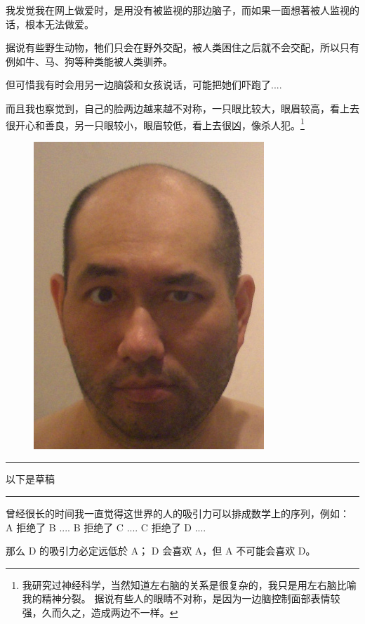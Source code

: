 \documentclass[12pt]{report}
\newcommand{\tab}{\hspace*{1cm}}
\newcommand*\todo{\begin{center}\color{red}  \rule{5cm}{0.5pt} 以下是草稿\, \rule{5cm}{0.5pt} \end{center}}
\begin{document}
我发觉我在网上做爱时，是用没有被监视的那边脑子，而如果一面想著被人监视的话，根本无法做爱。

据说有些野生动物，牠们只会在野外交配，被人类困住之后就不会交配，所以只有例如牛、马、狗等种类能被人类驯养。

但可惜我有时会用另一边脑袋和女孩说话，可能把她们吓跑了....

而且我也察觉到，自己的脸两边越来越不对称，一只眼比较大，眼眉较高，看上去很开心和善良，另一只眼较小，眼眉较低，看上去很凶，像杀人犯。\footnote{我研究过神经科学，当然知道左右脑的关系是很复杂的，我只是用左右脑比喻我的精神分裂。 据说有些人的眼睛不对称，是因为一边脑控制面部表情较强，久而久之，造成两边不一样。}

\begin{figure}
\centering
\includegraphics[scale=0.6]{2015June.jpg}
\end{figure}

\todo

曾经很长的时间我一直觉得这世界的人的吸引力可以排成数学上的序列，例如： \\
\tab \tab \tab A 拒绝了 B .... B 拒绝了 C .... C 拒绝了 D .... 
\begin{center}
\end{center}
那么 D 的吸引力必定远低於 A； D 会喜欢 A，但 A 不可能会喜欢 D。
\end{document}
